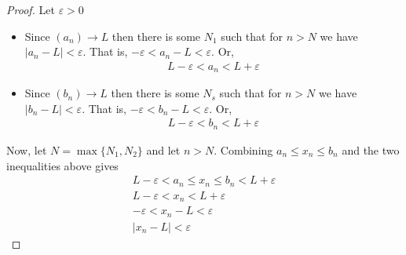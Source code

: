 \documentclass{article}
\begin{document}
\begin{proof}
	Let $\varepsilon > 0$

	\begin{itemize}
		\item Since $(a_n) \rightarrow L$ then there is some $N_1$ such that for $n > N$ we have $|a_n - L| < \varepsilon$. That is,
		      $- \varepsilon < a_n - L < \varepsilon$. Or,
		      \begin{align*}
			      L - \varepsilon < a_n < L + \varepsilon
		      \end{align*}
		\item Since $(b_n) \rightarrow L$ then there is some $N_s$ such that for $n > N$ we have $|b_n - L| < \varepsilon$. That is,
		      $- \varepsilon < b_n - L < \varepsilon$. Or,
		      \begin{align*}
			      L - \varepsilon < b_n < L + \varepsilon
		      \end{align*}
	\end{itemize}

	Now, let $N = \max\{N_1, N_2\}$ and let $n > N$. Combining $a_n \le x_n \le b_n$ and the two inequalities above gives
	\begin{gather*}
		L - \varepsilon < a_n \le x_n \le b_n < L + \varepsilon \\
		L - \varepsilon       <         x_n < L + \varepsilon   \\
		-\varepsilon          <        x_n - L < \varepsilon    \\
		|x_n - L|             < \varepsilon
	\end{gather*}

\end{proof}
\end{document}
